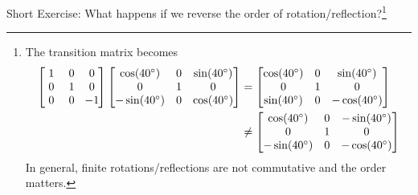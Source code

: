 Short Exercise: What happens if we reverse the order of rotation/reflection?\footnote{The transition matrix becomes
\begin{align*}
\left[\begin{array}{@{\,}wc{8pt}wc{8pt}wc{8pt}@{\,}}
1 & 0 & 0 \\
0 & 1 & 0 \\
0 & 0 & -1
\end{array}\right]   
\begin{bmatrix}
\cos(40^\circ) & 0 & \sin(40^\circ) \\
0 & 1 & 0 \\
-\sin(40^\circ) & 0 & \cos(40^\circ)
\end{bmatrix}
&=
\begin{bmatrix}
\cos(40^\circ) & 0 & \sin(40^\circ) \\
0 & 1 & 0 \\
\sin(40^\circ) & 0 & -\cos(40^\circ)
\end{bmatrix} \\
&\neq 
\begin{bmatrix}
\cos(40^\circ) & 0 & -\sin(40^\circ) \\
0 & 1 & 0 \\
-\sin(40^\circ) & 0 & -\cos(40^\circ)
\end{bmatrix}
\end{align*}
In general, finite rotations/reflections are not commutative and the order matters.
}

